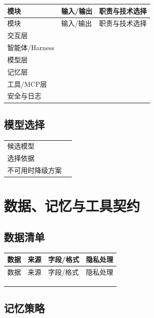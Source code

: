 \documentclass[UTF8,zihao=-4]{ctexart}
\begin{document}
\begin{longtable}{L{3.2cm} L{3.5cm} L{8.0cm}}
\toprule
模块 & 输入/输出 & 职责与技术选择\\
\midrule
\endfirsthead
\toprule
模块 & 输入/输出 & 职责与技术选择\\
\midrule
\endhead
交互层 & &\\[1.3cm]
智能体/Harness & &\\[1.3cm]
模型层 & &\\[1.3cm]
记忆层 & &\\[1.3cm]
工具/MCP层 & &\\[1.3cm]
安全与日志 & &\\[1.3cm]
\bottomrule
\end{longtable}

\subsection{模型选择}

\begin{tabularx}{\textwidth}{L{3.2cm} Y}
\toprule
候选模型 &\\[1.2cm]
选择依据 &\\[2cm]
不可用时降级方案 &\\[2cm]
\bottomrule
\end{tabularx}

\section{数据、记忆与工具契约}

\subsection{数据清单}

\begin{longtable}{L{3cm} L{3cm} L{6.2cm} L{2.5cm}}
\toprule
数据 & 来源 & 字段/格式 & 隐私处理\\
\midrule
\endfirsthead
\toprule
数据 & 来源 & 字段/格式 & 隐私处理\\
\midrule
\endhead
 & & &\\[1.2cm]
 & & &\\[1.2cm]
 & & &\\[1.2cm]
\bottomrule
\end{longtable}

\subsection{记忆策略}
\end{document}
